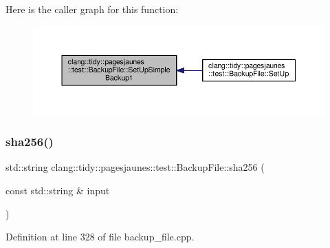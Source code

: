 Here is the caller graph for this function\+:
\nopagebreak
\begin{figure}[H]
\begin{center}
\leavevmode
\includegraphics[width=350pt]{classclang_1_1tidy_1_1pagesjaunes_1_1test_1_1_backup_file_a20076e5d45d3df60f6417d6cd7e10f66_icgraph}
\end{center}
\end{figure}
\mbox{\label{classclang_1_1tidy_1_1pagesjaunes_1_1test_1_1_backup_file_a146fa015b7bb79122129c84f4d0ef54f}} 
\subsubsection{\texorpdfstring{sha256()}{sha256()}\hspace{0.1cm}{\footnotesize\ttfamily [1/2]}}
{\footnotesize\ttfamily std\+::string clang\+::tidy\+::pagesjaunes\+::test\+::\+Backup\+File\+::sha256 (\begin{DoxyParamCaption}\item[{const std\+::string \&}]{input }\end{DoxyParamCaption})}



Definition at line 328 of file backup\+\_\+file.\+cpp.

